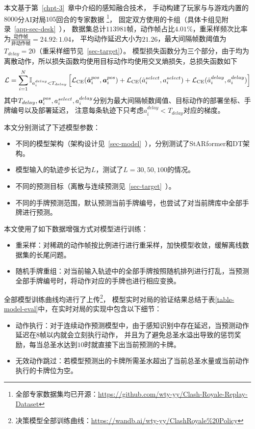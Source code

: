 \label{sec-decision-model}
本文基于第~\ref{chpt-3}~章中介绍的感知融合技术，
手动构建了玩家与与游戏内置的$8000$分AI对局$105$回合的专家数据
\footnote{全部专家数据集均已开源：\url{https://github.com/wty-yy/Clash-Royale-Replay-Dataset}}，
固定双方使用的卡组（具体卡组见附录~\ref{app-sec-desk}~），
数据集总计$113981$帧，动作帧占比$4.01\%$，重采样频次比率为$\frac{\text{动作帧}}{\text{非动作帧}}=24.92:1.04$，
平均动作延迟大小为$21.26$，最大间隔帧数阈值为$T_{delay}=20$（重采样细节见~\ref{sec-target}）。
模型损失函数分为三个部分，由于均为离散动作，所以损失函数均使用目标动作均使用交叉熵损失，总损失函数如下
\begin{equation}
  \mathcal{L} =
  \sum_{\substack{i=1\\}}^N\mathbb{I}_{a_i^{delay} < T_{delay}}\left[\mathcal{L}_{\text{CE}}(\hat{\boldsymbol{a}}_i^{pos}, \boldsymbol{a}_i^{pos})+
  \mathcal{L}_{\text{CE}}(\hat{a}_i^{select}, a_i^{select}) + 
  \mathcal{L}_{\text{CE}}(\hat{a}_i^{delay}, a_i^{delay})\right]
\end{equation}
其中$T_{delay},\boldsymbol{a}_i^{pos},a_i^{select},a_i^{delay}$分别为最大间隔帧数阈值、目标动作的部署坐标、手牌编号以及部署延迟，
注意每条轨迹下只考虑$a_i^{delay} < T_{delay}$对应的梯度。

本文分别测试了下述模型参数：
\begin{itemize}
  \item 不同的模型架构（架构设计见~\ref{sec-model}~），分别测试了StARformer和DT架构。
  \item 模型输入的轨迹步长记为$L$，测试了$L=30,50,100$的情况。
  \item 不同的预测目标（离散与连续预测见~\ref{sec-target}~）。
  \item 不同的手牌预测范围，默认预测当前手牌编号，也尝试了对当前牌库中全部手牌进行预测。
\end{itemize}

本文使用了如下数据增强方式对模型进行训练：
\begin{itemize}
  \item 重采样：对稀疏的动作帧按比例进行进行重采样，加快模型收敛，缓解离线数据集的长尾问题。
  \item 随机手牌重组：对当前输入轨迹中的全部手牌按照随机排列进行打乱，当预测全部手牌编号时，将动作对应的手牌也进行相应变换。
\end{itemize}

全部模型训练曲线均进行了上传\footnote{决策模型全部训练曲线：\url{https://wandb.ai/wty-yy/ClashRoyale\%20Policy}}，
模型实时对局的验证结果总结于表\ref{table-model-eval}中，在实时对局的实现中包含以下细节：
\begin{itemize}
  \item 动作执行：对于连续动作预测模型中，由于感知识别中存在延迟，当预测动作延迟在$8$帧以内就会立刻执行动作，
  并且为了避免总圣水溢出导致的惩罚奖励，每当总圣水达到$10$时就直接下出当前预测的卡牌。
  \item 无效动作跳过：若模型预测出的卡牌所需圣水超出了当前总圣水量或当前动作执行的卡牌位为空。
\end{itemize}

